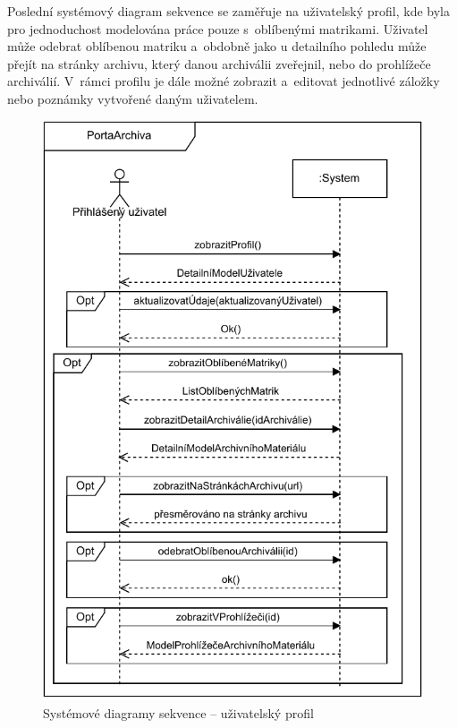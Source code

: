 \newpage
\noindent
Poslední systémový diagram sekvence se zaměřuje na uživatelský profil, kde byla pro jednoduchost modelována práce pouze s~oblíbenými matrikami. Uživatel může odebrat oblíbenou matriku a~obdobně jako u detailního pohledu může přejít na stránky archivu, který danou archiválii zveřejnil, nebo do prohlížeče archiválií. V~rámci profilu je dále možné zobrazit a~editovat jednotlivé záložky nebo poznámky vytvořené daným uživatelem.

\begin{figure}[htbp]
\centering
    \includegraphics[scale=.9]{obrazky-figures/specification/SSD_user_profile.pdf}
    \caption{Systémové diagramy sekvence – uživatelský profil}
\end{figure}

